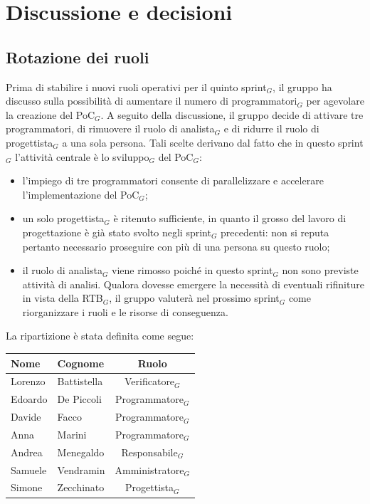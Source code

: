 \documentclass[a4paper, 10pt, colorlinks=true, linkcolor=black, urlcolor=blue, citecolor=blue, hidelinks]{article}
\begin{document}
\section{Discussione e decisioni}

\subsection{Rotazione dei ruoli}
Prima di stabilire i nuovi ruoli operativi per il quinto sprint$_G$, il gruppo ha discusso sulla possibilità di aumentare il numero di programmatori$_G$ per agevolare la creazione del PoC$_G$.
A seguito della discussione, il gruppo decide di attivare tre programmatori, di rimuovere il ruolo di analista$_G$ e di ridurre il ruolo di progettista$_G$ a una sola persona. Tali scelte derivano dal fatto che in questo sprint$_G$ l'attività centrale è lo sviluppo$_G$ del PoC$_G$:
\begin{itemize}
    \item l'impiego di tre programmatori consente di parallelizzare e accelerare l'implementazione del PoC$_G$;
    \item un solo progettista$_G$ è ritenuto sufficiente, in quanto il grosso del lavoro di progettazione è già stato svolto negli sprint$_G$ precedenti: non si reputa pertanto necessario proseguire con più di una persona su questo ruolo;
    \item il ruolo di analista$_G$ viene rimosso poiché in questo sprint$_G$ non sono previste attività di analisi. Qualora dovesse emergere la necessità di eventuali rifiniture in vista della RTB$_G$, il gruppo valuterà nel prossimo sprint$_G$ come riorganizzare i ruoli e le risorse di conseguenza.
\end{itemize}

La ripartizione è stata definita come segue:
\begin{center}
    \begin{tabular}{|l|l|c|}
        \hline
        \textbf{Nome} & \textbf{Cognome} & \textbf{Ruolo} \\
        \hline
        Lorenzo & Battistella & Verificatore$_G$ \\
        \hline
        Edoardo & De Piccoli & Programmatore$_G$ \\
        \hline
        Davide & Facco & Programmatore$_G$ \\
        \hline
        Anna & Marini & Programmatore$_G$ \\
        \hline
        Andrea & Menegaldo & Responsabile$_G$ \\
        \hline
        Samuele & Vendramin & Amministratore$_G$ \\
        \hline
        Simone & Zecchinato & Progettista$_G$ \\
        \hline  
    \end{tabular}
\end{center}
\end{document}
